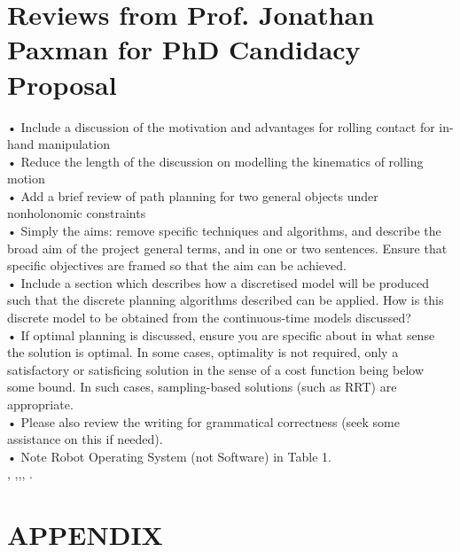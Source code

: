 \documentclass[a4paper]{article}
\begin{document}
\newpage
\section{Reviews from Prof. Jonathan Paxman for PhD Candidacy Proposal}
• Include a discussion of the motivation and advantages for rolling contact for in-hand manipulation\\
•	Reduce the length of the discussion on modelling the kinematics of rolling motion\\
•	Add a brief review of path planning for two general objects under nonholonomic constraints\\
•	Simply the aims: remove specific techniques and algorithms, and describe the broad aim of the project general terms, and in one or two sentences. Ensure that specific objectives are framed so that the aim can be achieved.\\
•	Include a section which describes how a discretised model will be produced such that the discrete planning algorithms described can be applied. How is this discrete model to be obtained from the continuous-time models discussed?\\
•	If optimal planning is discussed, ensure you are specific about in what sense the solution is optimal. In some cases, optimality is not required, only a satisfactory or satisficing solution in the sense of a cost function being below some bound. In such cases, sampling-based solutions (such as RRT) are appropriate.\\
•	Please also review the writing for grammatical correctness (seek some assistance on this if needed).\\
•	Note Robot Operating System (not Software) in Table 1.\\

\cite{Antonio04_NewPRM},
\cite{Kavraki02_Random_ConfigurationSpace_PP},\cite{Cai87_SpatialMotion_PointContact},\cite{Holland75_GAMethod},
\cite{Alouges10_MotionPlanning_RollingBody}.




\cleardoublepage
\normalem
\printbibliography 

%
%


\cleardoublepage
\appendix
\section{APPENDIX}
\label{appendix:A}
%
%
\end{document}
